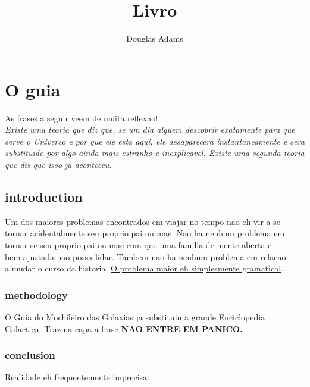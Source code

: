 \documentclass[12pt]{book}
\title{Livro}
\author{Douglas Adams}
\begin{document}
 
\maketitle

\chapter{O guia}

As frases a seguir veem de muita reflexao! \\

\it{Existe uma teoria que diz que, se um dia alguem descobrir exatamente
para que serve o Universo e por que ele esta aqui, ele desaparecera
instantaneamente e sera substituido por algo ainda mais estranho e
inexplicavel. Existe uma segunda teoria que diz que isso ja aconteceu.}

\section{introduction}

Um dos maiores problemas encontrados em viajar no tempo nao eh vir a se \\ tornar acidentalmente seu proprio pai ou mae. Nao ha nenhum problema em \\ tornar-se seu proprio pai ou mae com que uma familia de mente aberta e \\ bem ajustada nao possa lidar. Tambem nao ha nenhum problema em relacao  \\ a mudar o curso da historia. \underline{O problema maior eh simplesmente gramatical}.

\subsection{methodology}
O Guia do Mochileiro das Galaxias ja substituiu a grande Enciclopedia \\ Galactica. Traz na capa a frase \bf{NAO ENTRE EM PANICO}.

\subsection{conclusion}
Realidade eh frequentemente imprecisa.
\end{document}
